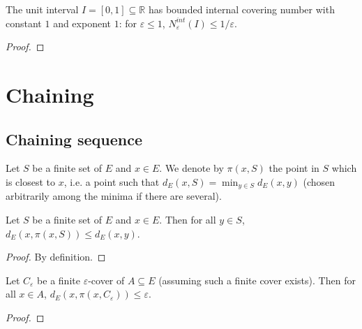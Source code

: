 \begin{lemma}\label{lem:hasBoundedInternalCoveringNumber_unitInterval}
The unit interval $I = [0, 1] \subseteq \mathbb{R}$ has bounded internal covering number with constant $1$ and exponent $1$: for $\varepsilon \le 1$, $N^{int}_\varepsilon(I) \le 1/\varepsilon$.
\end{lemma}

\begin{proof}

\end{proof}


\section{Chaining}

\subsection{Chaining sequence}


\begin{definition}\label{def:nearestPt}
  \leanok
Let $S$ be a finite set of $E$ and $x \in E$.
We denote by $\pi(x, S)$ the point in $S$ which is closest to $x$, i.e. a point such that $d_E(x, S) = \min_{y \in S} d_E(x, y)$ (chosen arbitrarily among the minima if there are several).
\end{definition}


\begin{lemma}\label{lem:dist_nearestPt_le}
  \leanok
Let $S$ be a finite set of $E$ and $x \in E$.
Then for all $y \in S$, $d_E(x, \pi(x, S)) \le d_E(x, y)$.
\end{lemma}

\begin{proof}\leanok
By definition.
\end{proof}


\begin{lemma}\label{lem:dist_nearestPt_of_isCover}
  \leanok
Let $C_\varepsilon$ be a finite $\varepsilon$-cover of $A \subseteq E$ (assuming such a finite cover exists).
Then for all $x \in A$, $d_E(x, \pi(x, C_\varepsilon)) \le \varepsilon$.
\end{lemma}

\begin{proof}\leanok

\end{proof}


